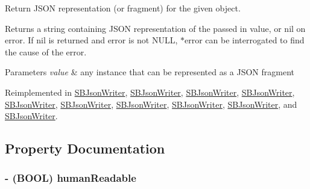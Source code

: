 \-Return \-J\-S\-O\-N representation (or fragment) for the given object. 

\-Returns a string containing \-J\-S\-O\-N representation of the passed in value, or nil on error. \-If nil is returned and {\ttfamily error} is not \-N\-U\-L\-L, {\ttfamily $\ast$error} can be interrogated to find the cause of the error.


\begin{DoxyParams}{\-Parameters}
{\em value} & any instance that can be represented as a \-J\-S\-O\-N fragment \\
\hline
\end{DoxyParams}


\-Reimplemented in \hyperlink{interface_s_b_json_writer_a9018ceff9753092b310a43782c5083ed}{\-S\-B\-Json\-Writer}, \hyperlink{interface_s_b_json_writer_a98b0a676d8bc77281759765a5cc847fc}{\-S\-B\-Json\-Writer}, \hyperlink{interface_s_b_json_writer_a98b0a676d8bc77281759765a5cc847fc}{\-S\-B\-Json\-Writer}, \hyperlink{interface_s_b_json_writer_a98b0a676d8bc77281759765a5cc847fc}{\-S\-B\-Json\-Writer}, \hyperlink{interface_s_b_json_writer_a98b0a676d8bc77281759765a5cc847fc}{\-S\-B\-Json\-Writer}, \hyperlink{interface_s_b_json_writer_a98b0a676d8bc77281759765a5cc847fc}{\-S\-B\-Json\-Writer}, \hyperlink{interface_s_b_json_writer_a98b0a676d8bc77281759765a5cc847fc}{\-S\-B\-Json\-Writer}, \hyperlink{interface_s_b_json_writer_a98b0a676d8bc77281759765a5cc847fc}{\-S\-B\-Json\-Writer}, \hyperlink{interface_s_b_json_writer_a98b0a676d8bc77281759765a5cc847fc}{\-S\-B\-Json\-Writer}, and \hyperlink{interface_s_b_json_writer_a98b0a676d8bc77281759765a5cc847fc}{\-S\-B\-Json\-Writer}.



\subsection{\-Property \-Documentation}
\hypertarget{protocol_s_b_json_writer-p_a69f531597668b4b3c20aabee1e3d4558}{
\subsubsection[{human\-Readable}]{\setlength{\rightskip}{0pt plus 5cm}-\/ (\-B\-O\-O\-L) human\-Readable}}
\label{protocol_s_b_json_writer-p_a69f531597668b4b3c20aabee1e3d4558}


